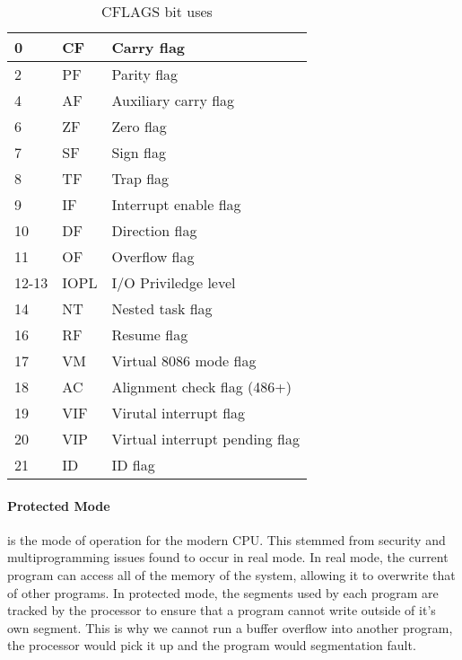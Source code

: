 \documentclass[a4paper,11pt]{book}
\begin{document}
\begin{itemize}
\begin{table}[htb]
\begin{tabular}{| l | l | l |}
									0   &   CF &     Carry flag \\ \hline
									2   &   PF   &   Parity flag \\ \hline
									4   &   AF   &   Auxiliary carry flag \\ \hline
									6   &   ZF   &   Zero flag \\ \hline
									7   &   SF   &   Sign flag \\ \hline
									8   &   TF   &   Trap flag \\ \hline
									9   &   IF   &   Interrupt enable flag \\ \hline
									10  &   DF   &   Direction flag \\ \hline
									11  &   OF   &   Overflow flag \\ \hline
									12-13 & IOPL &   I/O Priviledge level \\ \hline
									14  &   NT   &   Nested task flag \\ \hline
									16  &   RF   &   Resume flag \\ \hline
									17  &   VM   &   Virtual 8086 mode flag \\ \hline
									18  &   AC   &   Alignment check flag (486+) \\ \hline
									19  &   VIF  &   Virutal interrupt flag \\ \hline
									20  &   VIP  &   Virtual interrupt pending flag \\ \hline
									21  &   ID   &   ID flag \\ \hline
							\end{tabular}
								\caption{CFLAGS bit uses}
								\label{tab:CFLAGSBits}
							\end{table}
				\end{itemize}
			\paragraph{Protected Mode} 
				is the mode of operation for the modern CPU. 
				This stemmed from security and multiprogramming issues found to occur in real mode. 
				In real mode, the current program can access all of the memory of the system, allowing it to overwrite that of other programs. 
				In protected mode, the segments used by each program are tracked by the processor to ensure that a program cannot write outside of it's own segment. 
				This is why we cannot run a buffer overflow into another program, the processor would pick it up and the program would segmentation fault. 
\end{document}
